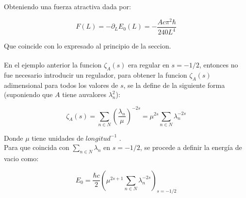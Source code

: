 Obteniendo una fuerza atractiva dada por:

\begin{equation}
F(L) = - \partial _L E _0 (L) = 
- \frac{A c \pi ^2 \hbar}{240 L^4}
\end{equation}

Que coincide con lo expresado al principio de la seccion. \\ \\


En el ejemplo anterior la funcion $\zeta _A (s) $ era regular en $s= -1/2$, entonces no fue necesario introducir un regulador, para obtener la funcion $\zeta _A (s)$ adimensional para todos los valores de $s$, se la define de la siguiente forma (suponiendo que $A$ tiene auvalores $\lambda _n ^2 $):

\begin{equation}
\zeta _A (s) = \sum _{n \in N} \left( \frac{\lambda _n}{\mu }  \right) ^{-2s } = 
\mu ^{2s} \sum _{n \in N } \lambda _n ^{-2s}
\end{equation}

Donde $\mu $ tiene unidades de $longitud ^{-1}$ . \\

Para que coincida con $\underset{ {n \in N}}{  \sum } \lambda _n$ en $s= -1/2$, se procede a definir la energía de vacio como:

\begin{equation}
E _ 0 = 
\frac{\hbar c}{2 }
\left(
	\mu ^{2s+1} \sum _{n \in N} \lambda _n ^{-2s} 
	\right) _{s=-1/2}
\end{equation}